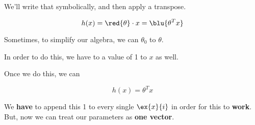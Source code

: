         We'll write that symbolically, and then apply a transpose.
        
        \begin{equation}
            h(x) = \red{\theta} \cdot x = \blu{ \theta^T x }
        \end{equation}
        
        \begin{concept}
            Sometimes, to simplify our algebra, we can  $\theta_0$ to $\theta$. 
            
            In order to do this, we have to  a value of 1 to $x$ as well.
            
            Once we do this, we can  
            
            \begin{equation*}
                h(x)=\theta^T x
            \end{equation*}
        \end{concept}
        
        We \textbf{have} to append this 1 to every single $\ex{x}{i}$ in order for this to \textbf{work}. But, now we can treat our parameters as \textbf{one vector}.
